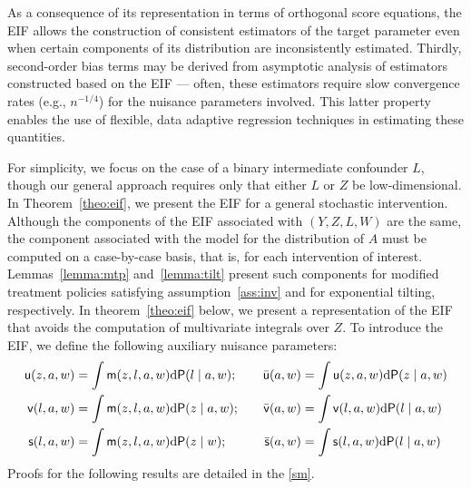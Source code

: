As a consequence of its representation in terms of orthogonal score equations,
the EIF allows the construction of consistent estimators of the target parameter
even when certain components of its distribution are inconsistently estimated.
Thirdly, second-order bias terms may be derived from asymptotic analysis of
estimators constructed based on the EIF --- often, these estimators require slow
convergence rates (e.g., $n^{-1/4}$) for the nuisance parameters involved. This
latter property enables the use of flexible, data adaptive regression techniques
in estimating these quantities.

For simplicity, we focus on the case of a binary intermediate confounder $L$,
though our general approach requires only that either $L$ or $Z$ be
low-dimensional. In Theorem~\ref{theo:eif}, we present the EIF for a general
stochastic intervention. Although the components of the EIF associated with
$(Y,Z,L,W)$ are the same, the component associated with the model for the
distribution of $A$ must be computed on a case-by-case basis, that is, for each
intervention of interest. Lemmas~\ref{lemma:mtp} and~\ref{lemma:tilt} present
such components for modified treatment policies satisfying
assumption~\ref{ass:inv} and for exponential tilting, respectively. In
theorem~\ref{theo:eif} below, we present a representation of the EIF that avoids
the computation of multivariate integrals over $Z$. To introduce the EIF, we
define the following auxiliary nuisance parameters:
\begin{equation}
  \begin{split}
  \mathsf{u}(z,a,w) & = \int \mathsf{m}(z,l,a,w) \mathrm{d}\mathsf{P}(l\mid a,w);\\
  \mathsf{v}(l,a,w) & = \int \mathsf{m}(z,l,a,w) \mathrm{d}\mathsf{P}(z\mid a,w);\\
  \mathsf{s}(l,a,w) & = \int \mathsf{m}(z,l,a,w) \mathrm{d}\mathsf{P}(z\mid w);
\end{split}\quad\quad
\begin{split}
\bar {\mathsf{u}}(a,w) & = \int \mathsf{u}(z,a,w) \mathrm{d}\mathsf{P}(z\mid a,w)\\
  \bar {\mathsf{v}}(a,w) & = \int \mathsf{v}(l,a,w) \mathrm{d}\mathsf{P}(l\mid a,w)\\
  \bar {\mathsf{s}}(a,w) & = \int \mathsf{s}(l,a,w) \mathrm{d}\mathsf{P}(l\mid a,w)
\end{split}\label{eq:nuis}
\end{equation}
Proofs for the following results are detailed in the \ref{sm}.
